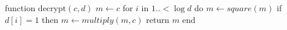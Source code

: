 \documentclass[margin={0 0 39mm 0}]{standalone}
\begin{document}
\begin{Pseudocode}[frame=single]
function $\text{decrypt}(c, d)$
  $m \gets c$
  for $i$ in $1 ..{<} \log d$ do
    $m \gets square(m)$
    if $d[i] = 1$ then
      $m \gets multiply(m, c)$
  return $m$
end
\end{Pseudocode}
\end{document}
